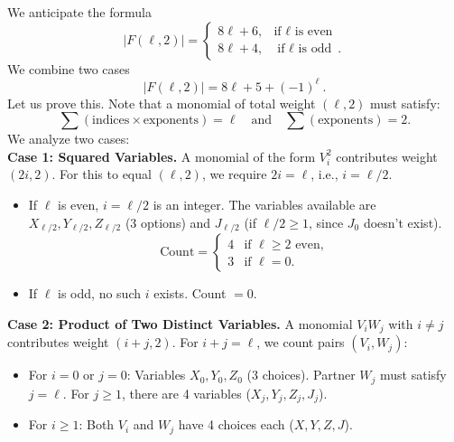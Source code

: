 \documentclass[a4paper,10pt]{article}
\begin{document}
We anticipate the formula
\begin{equation}
\label{eq:num_Fl2}
|F(\ell,2)|=\begin{cases}
8\ell + 6, & \text{if $\ell$ is even}\\
8\ell + 4, & \text{if $\ell$ is odd}~.
\end{cases}
\end{equation}
We combine two cases 
\begin{equation}\label{eq:free_words_t2}
|F(\ell,2)| = 8\ell + 5 + (-1)^\ell~.
\end{equation}
Let us prove this. Note that
a monomial of total weight $(\ell, 2)$ must satisfy:
\begin{equation}
\sum (\text{indices} \times \text{exponents}) = \ell \quad \text{and} \quad \sum (\text{exponents}) = 2.
\end{equation}
We analyze two cases:
\\
\textbf{Case 1: Squared Variables.}
A monomial of the form $V_i^2$ contributes weight $(2i, 2)$. For this to equal $(\ell, 2)$, we require $2i = \ell$, i.e., $i = \ell/2$. 
\begin{itemize}
    \item If $\ell$ is even, $i = \ell/2$ is an integer. The variables available are $X_{\ell/2}, Y_{\ell/2}, Z_{\ell/2}$ (3 options) and $J_{\ell/2}$ (if $\ell/2 \geq 1$, since $J_0$ doesn't exist). 
    \begin{equation}
    \text{Count} = 
    \begin{cases} 
    4 & \text{if } \ell \geq 2 \text{ even}, \\
    3 & \text{if } \ell = 0.
    \end{cases}
    \end{equation}
    \item If $\ell$ is odd, no such $i$ exists. Count $= 0$.
\end{itemize}
\textbf{Case 2: Product of Two Distinct Variables.}
A monomial $V_i W_j$ with $i \neq j$ contributes weight $(i + j, 2)$. For $i + j = \ell$, we count pairs $(V_i, W_j)$:
\begin{itemize}
    \item For $i = 0$ or $j=0$: Variables $X_0, Y_0, Z_0$ (3 choices). Partner $W_j$ must satisfy $j = \ell$. For $j \geq 1$, there are 4 variables ($X_j, Y_j, Z_j, J_j$).
    \item For $i \geq 1$: Both $V_i$ and $W_j$ have 4 choices each ($X, Y, Z, J$).
\end{itemize}
\end{document}
